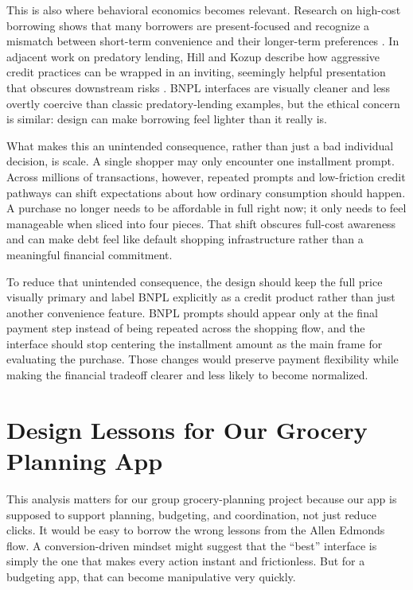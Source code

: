 \documentclass[11pt]{article}
\begin{document}
This is also where behavioral economics becomes relevant. Research on high-cost borrowing shows that many borrowers are present-focused and recognize a mismatch between short-term convenience and their longer-term preferences \citep{allcottNBERWORKINGPAPER}. In adjacent work on predatory lending, Hill and Kozup describe how aggressive credit practices can be wrapped in an inviting, seemingly helpful presentation that obscures downstream risks \citep{hillConsumerExperiencesPredatory2007}. BNPL interfaces are visually cleaner and less overtly coercive than classic predatory-lending examples, but the ethical concern is similar: design can make borrowing feel lighter than it really is.

What makes this an unintended consequence, rather than just a bad individual decision, is scale. A single shopper may only encounter one installment prompt. Across millions of transactions, however, repeated prompts and low-friction credit pathways can shift expectations about how ordinary consumption should happen. A purchase no longer needs to be affordable in full right now; it only needs to feel manageable when sliced into four pieces. That shift obscures full-cost awareness and can make debt feel like default shopping infrastructure rather than a meaningful financial commitment.

To reduce that unintended consequence, the design should keep the full price visually primary and label BNPL explicitly as a credit product rather than just another convenience feature. BNPL prompts should appear only at the final payment step instead of being repeated across the shopping flow, and the interface should stop centering the installment amount as the main frame for evaluating the purchase. Those changes would preserve payment flexibility while making the financial tradeoff clearer and less likely to become normalized.

\section{Design Lessons for Our Grocery Planning App}

This analysis matters for our group grocery-planning project because our app is supposed to support planning, budgeting, and coordination, not just reduce clicks. It would be easy to borrow the wrong lessons from the Allen Edmonds flow. A conversion-driven mindset might suggest that the ``best'' interface is simply the one that makes every action instant and frictionless. But for a budgeting app, that can become manipulative very quickly.
\end{document}
